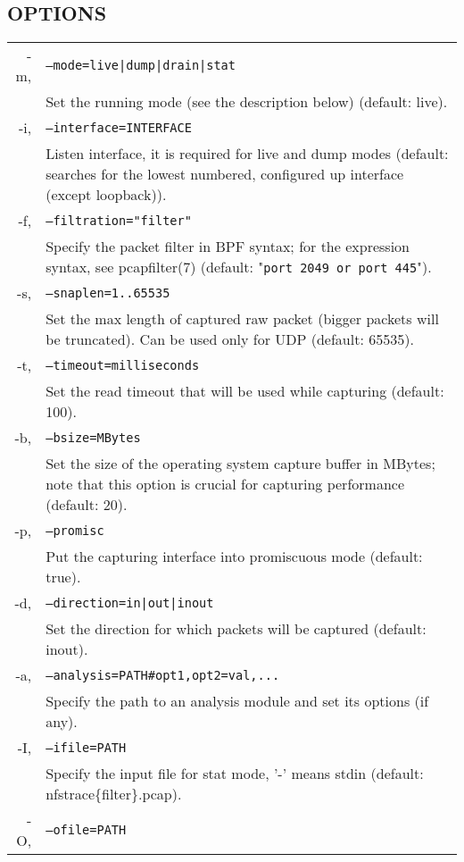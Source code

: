 \documentclass[oneside]{article}
\newcommand{\code}[1]{\texttt{#1}}
\newcommand{\gls}{}
\newcommand*{\textfile}[1]{\textsf{#1}}
\newcommand*{\textprog}[1]{\textfile{#1}}
\begin{document}
\subsection{OPTIONS}
\begin{tabularx}{\linewidth}{ r X }
\textprog{-m}, & \code{--mode=live|dump|drain|stat} \\
 & Set the running mode (see the description below) (default: live).\\ 
\textprog{-i}, & \code{--interface=INTERFACE}\\
& Listen interface, it is required for live and dump modes (default: searches
for the lowest numbered, configured up interface (except loopback)).\\
\textprog{-f}, & \code{--filtration="filter"}\\
    & Specify the packet filter in \gls{BPF} syntax; for the expression syntax, see
pcapfilter(7) (default: "\code{port 2049 or port 445}").\\
\textprog{-s}, & \code{--snaplen=1..65535}\\
& Set the max length of captured raw packet (bigger packets will be truncated).
Can be used only for UDP (default: 65535).\\
\textprog{-t}, & \code{--timeout=milliseconds}\\
& Set the read timeout that will be used while capturing (default: 100).\\
\textprog{-b}, & \code{--bsize=MBytes}\\
& Set the size of the operating system capture buffer in MBytes; note that this
option is crucial for capturing performance (default: 20).\\
\textprog{-p}, & \code{--promisc}\\
& Put the capturing interface into promiscuous mode (default: true).\\
\textprog{-d}, & \code{--direction=in|out|inout}\\
& Set the direction for which packets will be captured (default: inout).\\
\textprog{-a}, & \code{--analysis=PATH\#opt1,opt2=val,...}\\
& Specify the path to an analysis module and set its options (if any).\\
\textprog{-I}, & \code{--ifile=PATH}\\
& Specify the input file for stat mode, '-' means stdin (default:
nfstrace\{filter\}.pcap).\\
\textprog{-O}, & \code{--ofile=PATH}\\

\end{tabularx}
\end{document}
